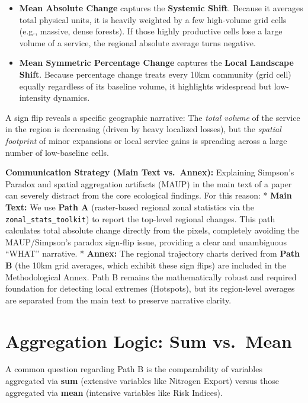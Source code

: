 \documentclass[
  letterpaper,
  DIV=11,
  numbers=noendperiod]{scrreprt}
\providecommand{\tightlist}{%
  \setlength{\itemsep}{0pt}\setlength{\parskip}{0pt}}
\begin{document}
\begin{itemize}
\tightlist
\item
  \textbf{Mean Absolute Change} captures the \textbf{Systemic Shift}.
  Because it averages total physical units, it is heavily weighted by a
  few high-volume grid cells (e.g., massive, dense forests). If those
  highly productive cells lose a large volume of a service, the regional
  absolute average turns negative.
\item
  \textbf{Mean Symmetric Percentage Change} captures the \textbf{Local
  Landscape Shift}. Because percentage change treats every 10km
  community (grid cell) equally regardless of its baseline volume, it
  highlights widespread but low-intensity dynamics.
\end{itemize}

A sign flip reveals a specific geographic narrative: The \emph{total
volume} of the service in the region is decreasing (driven by heavy
localized losses), but the \emph{spatial footprint} of minor expansions
or local service gains is spreading across a large number of
low-baseline cells.

\textbf{Communication Strategy (Main Text vs.~Annex):} Explaining
Simpson's Paradox and spatial aggregation artifacts (MAUP) in the main
text of a paper can severely distract from the core ecological findings.
For this reason: * \textbf{Main Text:} We use \textbf{Path A}
(raster-based regional zonal statistics via the
\texttt{zonal\_stats\_toolkit}) to report the top-level regional
changes. This path calculates total absolute change directly from the
pixels, completely avoiding the MAUP/Simpson's paradox sign-flip issue,
providing a clear and unambiguous ``WHAT'' narrative. * \textbf{Annex:}
The regional trajectory charts derived from \textbf{Path B} (the 10km
grid averages, which exhibit these sign flips) are included in the
Methodological Annex. Path B remains the mathematically robust and
required foundation for detecting local extremes (Hotspots), but its
region-level averages are separated from the main text to preserve
narrative clarity.

\section{Aggregation Logic: Sum
vs.~Mean}\label{aggregation-logic-sum-vs.-mean}

A common question regarding Path B is the comparability of variables
aggregated via \textbf{sum} (extensive variables like Nitrogen Export)
versus those aggregated via \textbf{mean} (intensive variables like Risk
Indices).
\end{document}
